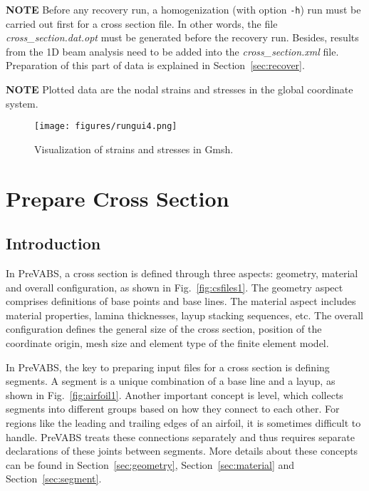 \documentclass{book}
\begin{document}
\textbf{NOTE} Before any recovery run, a homogenization (with option 
\lstinline{-h}) run must be carried out first for a cross section file. 
In other words, the file \textit{cross\_section.dat.opt} must be generated 
before the recovery run. Besides, results from the 1D beam analysis need 
to be added into the \textit{cross\_section.xml} file. Preparation of 
this part of data is explained in Section~\ref{sec:recover}.

\textbf{NOTE} Plotted data are the nodal strains and stresses in the 
global coordinate system.


\begin{figure}
  \centerline{\texttt{[image: figures/rungui4.png]}}
  \caption{Visualization of strains and stresses in Gmsh.}
  \label{fig:post}
\end{figure}




\chapter{Prepare Cross Section}

\section{Introduction}
\label{sec:introduction}

In PreVABS, a cross section is defined through three aspects: geometry, 
material and overall configuration, as shown in Fig.~\ref{fig:csfiles1}. 
The geometry aspect comprises definitions of base points and base lines. 
The material aspect includes material properties, lamina thicknesses, 
layup stacking sequences, etc. The overall configuration defines the 
general size of the cross section, position of the coordinate origin, 
mesh size and element type of the finite element model.

In PreVABS, the key to preparing input files for a cross section is 
defining segments. A segment is a unique combination of a base line and 
a layup, as shown in Fig.~\ref{fig:airfoil1}. Another important concept 
is level, which collects segments into different groups based on how 
they connect to each other. For regions like the leading and trailing 
edges of an airfoil, it is sometimes difficult to handle. PreVABS treats 
these connections separately and thus requires separate declarations of 
these joints between segments. More details about these concepts can be 
found in Section~\ref{sec:geometry}, Section~\ref{sec:material} and 
Section~\ref{sec:segment}.
\end{document}
